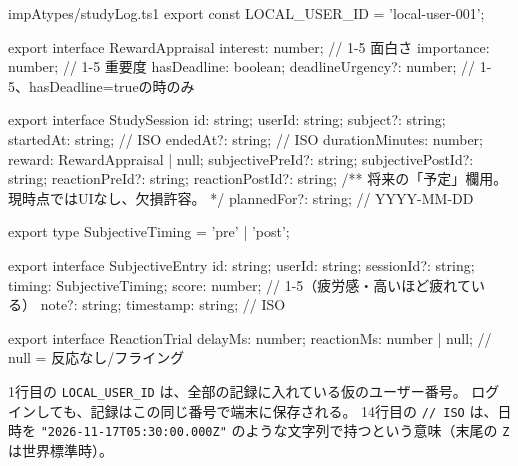 \begin{center}
\end{center}

\begin{codebox}{impA}{types/studyLog.ts}{1}
export const LOCAL_USER_ID = 'local-user-001';

export interface RewardAppraisal {
  interest: number; // 1-5 面白さ
  importance: number; // 1-5 重要度
  hasDeadline: boolean;
  deadlineUrgency?: number; // 1-5、hasDeadline=trueの時のみ
}

export interface StudySession {
  id: string;
  userId: string;
  subject?: string;
  startedAt: string; // ISO
  endedAt?: string; // ISO
  durationMinutes: number;
  reward: RewardAppraisal | null;
  subjectivePreId?: string;
  subjectivePostId?: string;
  reactionPreId?: string;
  reactionPostId?: string;
  /** 将来の「予定」欄用。現時点ではUIなし、欠損許容。 */
  plannedFor?: string; // YYYY-MM-DD
}

export type SubjectiveTiming = 'pre' | 'post';

export interface SubjectiveEntry {
  id: string;
  userId: string;
  sessionId?: string;
  timing: SubjectiveTiming;
  score: number; // 1-5（疲労感・高いほど疲れている）
  note?: string;
  timestamp: string; // ISO
}

export interface ReactionTrial {
  delayMs: number;
  reactionMs: number | null; // null = 反応なし/フライング
}
\end{codebox}

1行目の \texttt{LOCAL\_USER\_ID} は、全部の記録に入れている仮のユーザー番号。
ログインしても、記録はこの同じ番号で端末に保存される。
14行目の \texttt{// ISO} は、日時を \texttt{"2026-11-17T05:30:00.000Z"} のような文字列で持つという意味（末尾の \texttt{Z} は世界標準時）。

